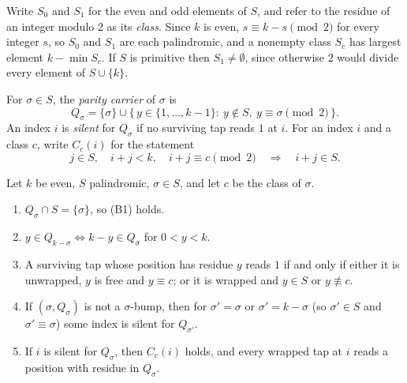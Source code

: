 Write $S_0$ and $S_1$ for the even and odd elements of $S$, and refer to the
residue of an integer modulo $2$ as its \emph{class}. Since $k$ is even,
$s\equiv k-s\pmod2$ for every integer $s$, so $S_0$ and $S_1$ are each
palindromic, and a nonempty class $S_c$ has largest element $k-\min S_c$.
If $S$ is primitive then $S_1\ne\emptyset$, since otherwise $2$ would divide
every element of $S\cup\{k\}$.

\begin{definition}
For $\sigma\in S$, the \emph{parity carrier} of $\sigma$ is
\[
Q_\sigma=\{\sigma\}\cup\{\,y\in\{1,\dots,k-1\}:\ y\notin S,\ y\equiv \sigma
\pmod2\,\}.
\]
An index $i$ is \emph{silent} for $Q_\sigma$ if no surviving tap reads $1$
at $i$. For an index $i$ and a class $c$, write $C_c(i)$ for the statement
\begin{equation}
j\in S,\quad i+j<k,\quad i+j\equiv c\pmod2\quad\Longrightarrow\quad i+j\in S .
\label{eq:nao-cont}
\end{equation}
\end{definition}

\begin{lemma}
\label{lem:nao-parity}
Let $k$ be even, $S$ palindromic, $\sigma\in S$, and let $c$ be the class of
$\sigma$.
\begin{enumerate}
\item[(a)] $Q_\sigma\cap S=\{\sigma\}$, so (B1) holds.
\item[(b)] $y\in Q_{k-\sigma}\iff k-y\in Q_\sigma$ for $0<y<k$.
\item[(c)] A surviving tap whose position has residue $y$ reads $1$ if and
only if either it is unwrapped, $y$ is free and $y\equiv c$; or it is wrapped and
$y\in S$ or $y\not\equiv c$.
\item[(d)] If $(\sigma,Q_\sigma)$ is not a $\sigma$-bump, then for
$\sigma'=\sigma$ or $\sigma'=k-\sigma$ (so $\sigma'\in S$ and
$\sigma'\equiv\sigma$) some index is silent for $Q_{\sigma'}$.
\item[(e)] If $i$ is silent for $Q_\sigma$, then $C_c(i)$ holds, and every
wrapped tap at $i$ reads a position with residue in $Q_\sigma$.
\end{enumerate}
\end{lemma}

